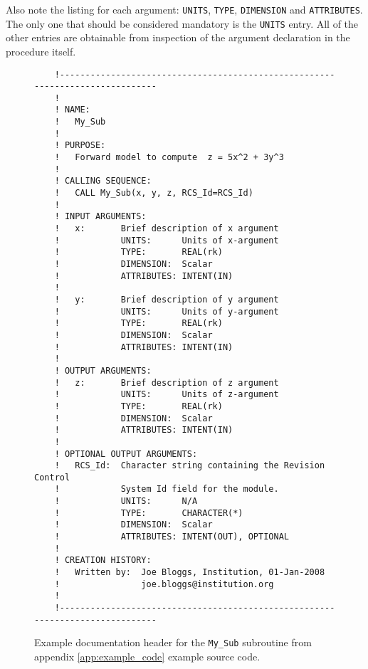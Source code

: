\begin{appendix}
 Also note the listing for each argument: \texttt{UNITS}, \texttt{TYPE}, \texttt{DIMENSION} and \texttt{ATTRIBUTES}. The only one that should be considered mandatory is the \texttt{UNITS} entry. All of the other entries are obtainable from inspection of the argument declaration in the procedure itself.
\begin{figure}[htp]
  \centering
  \begin{verbatim}
    !------------------------------------------------------------------------------
    !
    ! NAME:
    !   My_Sub
    !
    ! PURPOSE:
    !   Forward model to compute  z = 5x^2 + 3y^3
    !
    ! CALLING SEQUENCE:
    !   CALL My_Sub(x, y, z, RCS_Id=RCS_Id)
    !
    ! INPUT ARGUMENTS:
    !   x:       Brief description of x argument
    !            UNITS:      Units of x-argument
    !            TYPE:       REAL(rk)
    !            DIMENSION:  Scalar
    !            ATTRIBUTES: INTENT(IN)
    !
    !   y:       Brief description of y argument
    !            UNITS:      Units of y-argument
    !            TYPE:       REAL(rk)
    !            DIMENSION:  Scalar
    !            ATTRIBUTES: INTENT(IN)
    !
    ! OUTPUT ARGUMENTS:
    !   z:       Brief description of z argument
    !            UNITS:      Units of z-argument
    !            TYPE:       REAL(rk)
    !            DIMENSION:  Scalar
    !            ATTRIBUTES: INTENT(IN)
    !
    ! OPTIONAL OUTPUT ARGUMENTS:
    !   RCS_Id:  Character string containing the Revision Control
    !            System Id field for the module.
    !            UNITS:      N/A
    !            TYPE:       CHARACTER(*)
    !            DIMENSION:  Scalar
    !            ATTRIBUTES: INTENT(OUT), OPTIONAL
    !
    ! CREATION HISTORY:
    !   Written by:  Joe Bloggs, Institution, 01-Jan-2008
    !                joe.bloggs@institution.org
    !
    !------------------------------------------------------------------------------\end{verbatim}
  \caption{Example documentation header for the \texttt{My\_Sub} subroutine from appendix \ref{app:example_code} example source code.}
  \label{fig:dochdr_example}
\end{figure}
\end{appendix}




